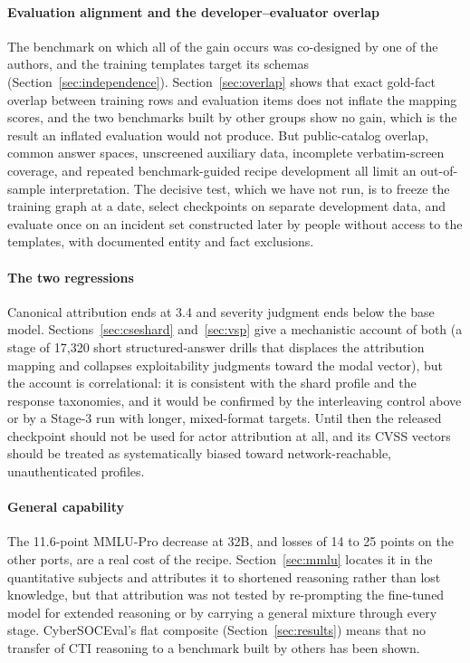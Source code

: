 \documentclass[twocolumn]{svjour3}
\begin{document}
\paragraph{Evaluation alignment and the developer--evaluator overlap}
The benchmark on which all of the gain occurs was co-designed by one of the authors, and the training templates target its schemas (Section~\ref{sec:independence}). Section~\ref{sec:overlap} shows that exact gold-fact overlap between training rows and evaluation items does not inflate the mapping scores, and the two benchmarks built by other groups show no gain, which is the result an inflated evaluation would not produce. But public-catalog overlap, common answer spaces, unscreened auxiliary data, incomplete verbatim-screen coverage, and repeated benchmark-guided recipe development all limit an out-of-sample interpretation. The decisive test, which we have not run, is to freeze the training graph at a date, select checkpoints on separate development data, and evaluate once on an incident set constructed later by people without access to the templates, with documented entity and fact exclusions.

\paragraph{The two regressions}
Canonical attribution ends at 3.4 and severity judgment ends below the base model. Sections~\ref{sec:cseshard} and~\ref{sec:vsp} give a mechanistic account of both (a stage of 17,320 short structured-answer drills that displaces the attribution mapping and collapses exploitability judgments toward the modal vector), but the account is correlational: it is consistent with the shard profile and the response taxonomies, and it would be confirmed by the interleaving control above or by a Stage-3 run with longer, mixed-format targets. Until then the released checkpoint should not be used for actor attribution at all, and its CVSS vectors should be treated as systematically biased toward network-reachable, unauthenticated profiles.

\paragraph{General capability}
The 11.6-point MMLU-Pro decrease at 32B, and losses of 14 to 25 points on the other ports, are a real cost of the recipe. Section~\ref{sec:mmlu} locates it in the quantitative subjects and attributes it to shortened reasoning rather than lost knowledge, but that attribution was not tested by re-prompting the fine-tuned model for extended reasoning or by carrying a general mixture through every stage. CyberSOCEval's flat composite (Section~\ref{sec:results}) means that no transfer of CTI reasoning to a benchmark built by others has been shown.
\end{document}
